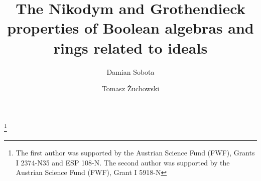 \documentclass[a4paper,11pt,fleqn]{amsart}
\theoremstyle{definition}
\theoremstyle{remark}
\numberwithin{equation}{section}
\begin{document}
\title[The Nikodym and Grothendieck properties of ideals]{The Nikodym and Grothendieck properties of Boolean algebras and rings related to ideals}

\author[D.\ Sobota]{Damian Sobota}
\address{Kurt G\"{o}del Research Center, Department of Mathematics, University of Vienna, Vienna, Austria.}

\author[T.\ \.{Z}uchowski]{Tomasz \.{Z}uchowski}
\address{Mathematical Institute, University of Wroc\l aw, Wroc\l aw, Poland.}
\thanks{The first author was supported by the Austrian Science Fund (FWF), Grants I 2374-N35 and ESP 108-N. The second author was supported by the Austrian Science Fund (FWF), Grant I 5918-N}
\end{document}
